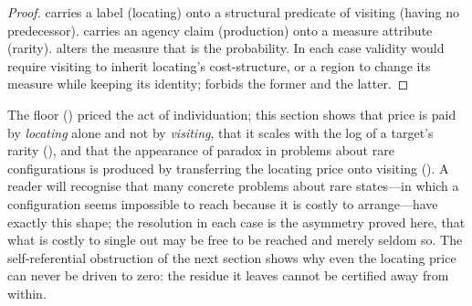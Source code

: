 \begin{proof}
 carries a label (locating) onto a structural predicate of
visiting (having no predecessor).  carries an agency claim
(production) onto a measure attribute (rarity).  alters
the measure that is the probability. In each case validity would require visiting
to inherit locating's cost-structure, or a region to change its measure while
keeping its identity;  forbids the former and
 the latter.
\end{proof}

\begin{remark}
\label{rem:locating-adds}
The floor () priced the act of individuation; this
section shows that price is paid by \emph{locating} alone and not by
\emph{visiting}, that it scales with the log of a target's rarity
(), and that the appearance of paradox in problems about
rare configurations is produced by transferring the locating price onto visiting
(). A reader will recognise that many concrete problems about
rare states---in which a configuration seems impossible to reach because it is
costly to arrange---have exactly this shape; the resolution in each case is the
asymmetry proved here, that what is costly to single out may be free to be reached
and merely seldom so. The self-referential obstruction of the next section shows
why even the locating price can never be driven to zero: the residue it leaves
cannot be certified away from within.
\end{remark}
